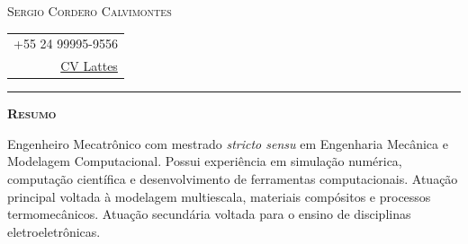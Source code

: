 \documentclass[a4paper, 10pt]{article}
\newcommand{\Calluna}{\rmfamily}
\newlength{\lblwidth}
\newcommand{\sectionBlock}[2]{%
	\par\addvspace{3pt}%
	\noindent%
	\begin{mdframed}[style=cvbox]%
		\noindent%
		\begin{minipage}[t]{\lblwidth}%
			\vspace{0pt}%
			\setstretch{1.0}%
			\raggedright%
			\small\scshape\Calluna%
			#1%
		\end{minipage}%
		\hspace{6pt}%
		\begin{minipage}[t]{\dimexpr\linewidth-\lblwidth-6pt\relax}%
			\vspace{0pt}%
			\setlength{\parindent}{0pt}%
			\setlength{\parskip}{2pt}%
			#2%
		\end{minipage}%
	\end{mdframed}%
	\par\addvspace{1pt}%
}
\renewcommand{\section}[1]{%
	{\small\bfseries\scshape #1}%
}
\newcommand{\cvBlock}{%
	\justifying%
	\setlength{\parindent}{0pt}%
	\setlength{\parskip}{2pt}%
	\noindent\ignorespaces%
}
\newcommand{\cvLine}[1]{%
	\noindent #1\par\vspace{1pt}%
}
\begin{document}
	\pagestyle{empty}
	
	\noindent
	\begin{minipage}[t]{0.68\textwidth}
		{\Calluna\fontsize{20pt}{26pt}\selectfont\textsc{Sergio Cordero Calvimontes}}
	\end{minipage}%
	\hfill
	\begin{minipage}[t]{0.28\textwidth}
		\raggedleft
		\begin{tabular}{@{}r@{}}
			{\Calluna\small +55 24 99995-9556} \\
			{\Calluna\small \href{http://lattes.cnpq.br/1576495718722378}{CV Lattes}}
		\end{tabular}
	\end{minipage}
	
	\par\vspace{1mm}
	\noindent\rule{\textwidth}{0.4pt}\par
	\vspace{2mm}
	
	\sectionBlock{
		\section{Resumo}
	}{
		\cvBlock
		\cvLine{Engenheiro Mecatrônico com mestrado \textit{stricto sensu} em Engenharia Mecânica
			e Modelagem Computacional. Possui experiência em simulação numérica, computação científica
			e desenvolvimento de ferramentas computacionais. Atuação principal voltada à modelagem multiescala,
			materiais compósitos e processos termomecânicos. Atuação secundária voltada para o ensino de disciplinas
			eletroeletrônicas.}
	}
	
\end{document}
